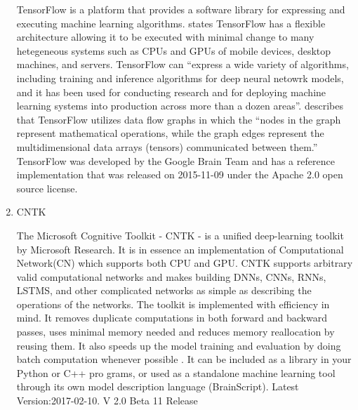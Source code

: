 \begin{enumerate}
TensorFlow is a platform that provides a software library for
expressing and executing machine learning
algorithms. \label{\detokenize{i524/technologies:id156}}{\hyperref[\detokenize{i524/technologies:tensorflow-paper-2016}]{\sphinxcrossref{{[}137{]}}}} states TensorFlow has a
flexible architecture allowing it to be executed with minimal
change to many hetegeneous systems such as CPUs and GPUs of mobile
devices, desktop machines, and servers. TensorFlow can ``express a
wide variety of algorithms, including training and inference
algorithms for deep neural netowrk models, and it has been used
for conducting research and for deploying machine learning systems
into production across more than a dozen
areas''. \label{\detokenize{i524/technologies:id157}}{\hyperref[\detokenize{i524/technologies:www-tensorflow}]{\sphinxcrossref{{[}138{]}}}} describes that TensorFlow utilizes
data flow graphs in which the ``nodes in the graph represent
mathematical operations, while the graph edges represent the
multidimensional data arrays (tensors) communicated between them.''
TensorFlow was developed by the Google Brain Team and has a
reference implementation that was released on 2015-11-09 under the
Apache 2.0 open source license.

\item {} 
CNTK

The Microsoft Cognitive Toolkit - CNTK - is a unified
deep-learning toolkit by Microsoft Research. It is in essence an
implementation of Computational Network(CN) which supports both
CPU and GPU. CNTK supports arbitrary valid computational networks
and makes building DNNs, CNNs, RNNs, LSTMS, and other complicated
networks as simple as describing the operations of the networks.
The toolkit is implemented with efficiency in mind. It removes
duplicate computations in both forward and backward passes, uses
minimal memory needed and reduces memory reallocation by reusing
them. It also speeds up the model training and evaluation by doing
batch computation whenever possible \label{\detokenize{i524/technologies:id158}}{\hyperref[\detokenize{i524/technologies:book-cntk}]{\sphinxcrossref{{[}139{]}}}} . It can be
included as a library in your Python or C++ pro grams, or used as
a standalone machine learning tool through its own model
description language (BrainScript). \label{\detokenize{i524/technologies:id159}}{\hyperref[\detokenize{i524/technologies:www-cntk}]{\sphinxcrossref{{[}140{]}}}} Latest
Version:2017-02-10. V 2.0 Beta 11 Release

\end{enumerate}


